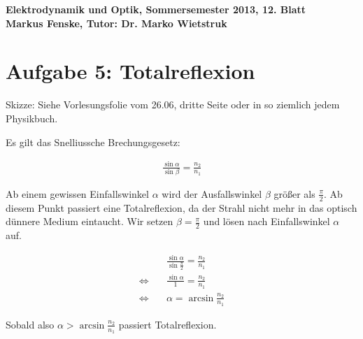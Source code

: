 \documentclass[a4paper,german,12pt,smallheadings]{scrartcl}
\begin{document}
\begin{center}
\bfseries %
\sffamily %
\vspace{-40pt}
Elektrodynamik und Optik, Sommersemester 2013, 12. Blatt \\
Markus Fenske, Tutor: Dr. Marko Wietstruk
\vspace{-10pt}
\end{center}
\section*{Aufgabe 5: Totalreflexion}

Skizze: Siehe Vorlesungsfolie vom 26.06, dritte Seite oder in so ziemlich jedem
Physikbuch.

Es gilt das Snelliussche Brechungsgesetz:

\begin{align*}
  \frac{\sin \alpha}{\sin \beta} = \frac{n_2}{n_1}
\end{align*}

Ab einem gewissen Einfallswinkel $\alpha$ wird der Ausfallswinkel $\beta$
größer als $\frac{\pi}{2}$. Ab diesem Punkt passiert eine Totalreflexion, da
der Strahl nicht mehr in das optisch dünnere Medium eintaucht. Wir setzen $\beta = \frac{\pi}{2}$ und lösen nach Einfallswinkel $\alpha$ auf.


\begin{align*}
  &\frac{\sin \alpha}{\sin \frac{\pi}{2}} = \frac{n_2}{n_1} \\
  \Leftrightarrow\quad&\frac{\sin \alpha}{1} = \frac{n_2}{n_1} \\
  \Leftrightarrow\quad&\alpha = \arcsin \frac{n_2}{n_1}
\end{align*}

Sobald also $\alpha > \arcsin \frac{n_2}{n_1}$ passiert Totalreflexion.
\end{document}
